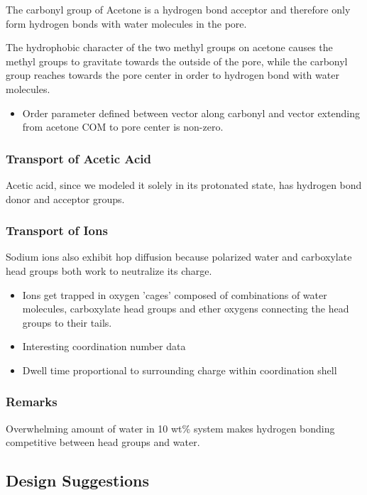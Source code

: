 \documentclass{article}
\begin{document}
  The carbonyl group of Acetone is a hydrogen bond acceptor and therefore only
  form hydrogen bonds with water molecules in the pore. 

  The hydrophobic character of the two methyl groups on acetone causes the methyl
  groups to gravitate towards the outside of the pore, while the carbonyl group
  reaches towards the pore center in order to hydrogen bond with water molecules.
  \begin{itemize}
	\item Order parameter defined between vector along carbonyl and vector extending
	from acetone COM to pore center is non-zero.
  \end{itemize} 

  \subsubsection*{Transport of Acetic Acid}

  Acetic acid, since we modeled it solely in its protonated state, has hydrogen
  bond donor and acceptor groups. 

  \subsubsection*{Transport of Ions} %

  Sodium ions also exhibit hop diffusion because polarized water and
  carboxylate head groups both work to neutralize its charge.
  \begin{itemize}
	\item Ions get trapped in oxygen 'cages' composed of combinations
	of water molecules, carboxylate head groups and ether oxygens connecting
	the head groups to their tails.
  	\item Interesting coordination number data
	\item Dwell time proportional to surrounding charge within coordination shell
  \end{itemize}

  \subsubsection*{Remarks}
   
  Overwhelming amount of water in 10 wt\% system makes hydrogen bonding
  competitive between head groups and water.

  \subsection{Design Suggestions}
\end{document}
